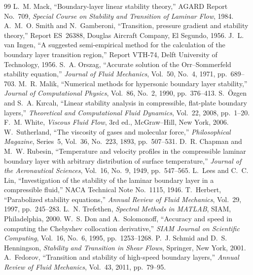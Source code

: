 \documentclass[11pt]{article}
\begin{document}
\begin{thebibliography}{99}
 L.~M. Mack, ``Boundary-layer linear stability theory,'' AGARD Report No.~709,
  \emph{Special Course on Stability and Transition of Laminar Flow}, 1984.
 A.~M.~O. Smith and N.~Gamberoni, ``Transition, pressure gradient and stability
  theory,'' Report ES~26388, Douglas Aircraft Company, El Segundo, 1956.
 J.~L. van Ingen, ``A suggested semi-empirical method for the calculation of
  the boundary layer transition region,'' Report VTH-74, Delft University of Technology, 1956.
 S.~A. Orszag, ``Accurate solution of the Orr--Sommerfeld stability equation,''
  \emph{Journal of Fluid Mechanics}, Vol.~50, No.~4, 1971, pp.~689--703.
 M.~R. Malik, ``Numerical methods for hypersonic boundary layer stability,''
  \emph{Journal of Computational Physics}, Vol.~86, No.~2, 1990, pp.~376--413.
 S.~\"Ozgen and S.~A. K{\i}rcal{\i}, ``Linear stability analysis in compressible,
  flat-plate boundary layers,'' \emph{Theoretical and Computational Fluid Dynamics}, Vol.~22, 2008,
  pp.~1--20.
 F.~M. White, \emph{Viscous Fluid Flow}, 3rd ed., McGraw--Hill, New York, 2006.
 W.~Sutherland, ``The viscosity of gases and molecular force,''
  \emph{Philosophical Magazine}, Series~5, Vol.~36, No.~223, 1893, pp.~507--531.
 D.~R. Chapman and M.~W. Rubesin, ``Temperature and velocity profiles in the
  compressible laminar boundary layer with arbitrary distribution of surface temperature,''
  \emph{Journal of the Aeronautical Sciences}, Vol.~16, No.~9, 1949, pp.~547--565.
 L.~Lees and C.~C. Lin, ``Investigation of the stability of the laminar
  boundary layer in a compressible fluid,'' NACA Technical Note No.~1115, 1946.
 T.~Herbert, ``Parabolized stability equations,'' \emph{Annual Review of
  Fluid Mechanics}, Vol.~29, 1997, pp.~245--283.
 L.~N. Trefethen, \emph{Spectral Methods in MATLAB}, SIAM, Philadelphia,
  2000.
 W.~S. Don and A.~Solomonoff, ``Accuracy and speed in computing the Chebyshev
  collocation derivative,'' \emph{SIAM Journal on Scientific Computing}, Vol.~16, No.~6, 1995,
  pp.~1253--1268.
 P.~J. Schmid and D.~S. Henningson, \emph{Stability and Transition in Shear
  Flows}, Springer, New York, 2001.
 A.~Fedorov, ``Transition and stability of high-speed boundary layers,''
  \emph{Annual Review of Fluid Mechanics}, Vol.~43, 2011, pp.~79--95.

\end{thebibliography}
\end{document}
